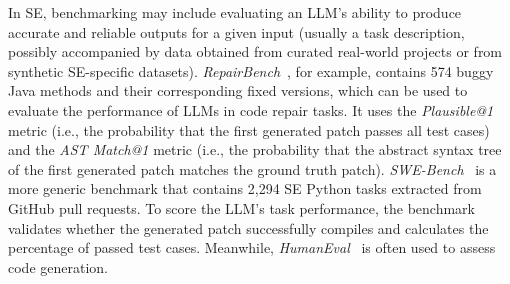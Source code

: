 In SE, benchmarking may include evaluating an LLM's ability to produce accurate and reliable outputs for a given input (usually a task description, possibly accompanied by data obtained from curated real-world projects or from synthetic SE-specific datasets). \emph{RepairBench}~\cite{DBLP:conf/llm4code/SilvaM25}, for example, contains 574 buggy Java methods and their corresponding fixed versions, which can be used to evaluate the performance of LLMs in code repair tasks. It uses the \emph{Plausible@1} metric (i.e., the probability that the first generated patch passes all test cases) and the \emph{AST Match@1} metric (i.e., the probability that the abstract syntax tree of the first generated patch matches the ground truth patch).
\emph{SWE-Bench}~\cite{DBLP:conf/iclr/JimenezYWYPPN24} is a more generic benchmark that contains 2,294 SE Python tasks extracted from GitHub pull requests.
To score the LLM's task performance, the benchmark validates whether the generated patch successfully compiles and calculates the percentage of passed test cases. Meanwhile, \emph{HumanEval}~\cite{DBLP:journals/corr/abs-2107-03374} is often used to assess code generation. 
